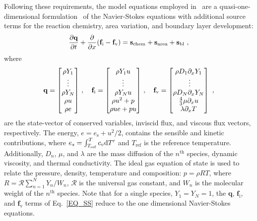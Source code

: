 Following these requirements, the model equations employed in \stnshk\ are a quasi-one-dimensional formulation~\cite{SAAD_BOOK} of the Navier-Stokes equations with additional source terms for the reaction chemistry, area variation, and boundary layer development:
\begin{equation}\label{EQ_SS}
\f{\p \mathbf{q}}{\p t}+\f{\p }{\p x}(\mathbf{f}_\mathrm{i}-\mathbf{ f}_\mathrm{v}  )=\mathbf{s}_\mathrm{chem}+\mathbf{s}_\mathrm{area}+\mathbf{s}_\mathrm{bl}\ ,
\end{equation}
where 
\begin{equation}
	\mathbf{q}=\begin{bmatrix}
		\rho Y_1 \\
		\vdots\\
		\rho Y_{N}\\
		\rho u\\
		\rho e
	\end{bmatrix}\,,\quad 
	\mathbf{f}_\mathrm{i}=\begin{bmatrix}
	\rho Y_1u \\
	\vdots\\
	\rho Y_Nu\\
	\rho u^2+p\\
	\rho ue+pu
	\end{bmatrix}
	\,,\quad 
	\mathbf{f}_\mathrm{v}=\begin{bmatrix}
	\rho D_1\partial_x Y_1 \\\
	\vdots\\
	\rho D_N\partial_x Y_N\\
	\frac{4}{3}\mu \partial_x u\\
	\lambda \partial_x T
	\end{bmatrix}\ ,
\end{equation}
are the state-vector of conserved variables, inviscid flux, and viscous flux vectors, respectively. The energy, $e=e_\mathrm{s}+u^2/2$, contains the sensible and kinetic contributions, where $e_s=\int_{T_\mathrm{ref}}^T c_v\textup d T^\prime$ and $T_\mathrm{ref}$ is the reference temperature. Additionally, $D_n$, $\mu$, and $\lambda$ are the mass diffusion of the $n^\mathrm{th}$ species, dynamic viscosity, and thermal conductivity. The ideal gas equation of state is used to relate the pressure, density, temperature and composition: $p=\rho R T$, where $R=\mathcal{R}\sum_{n=1}^N Y_n/W_n$, $\mathcal{R}$ is the universal gas constant, and $W_n$ is the molecular weight of the $n^\mathrm{th}$ species. Note that for a single species, $Y_1=Y_N=1$, the $\mathbf{q}$, $\mathbf{f}_\mathrm{i}$, and $\mathbf{f}_\mathrm{v}$ terms of Eq.~\ref{EQ_SS} reduce to the one dimensional Navier-Stokes equations. 


